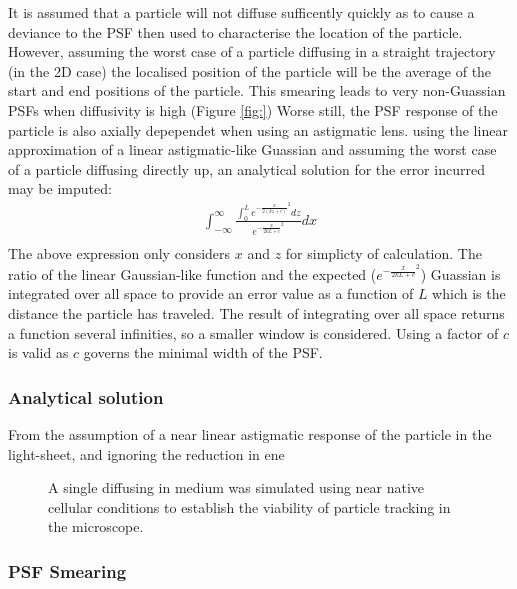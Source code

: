 It is assumed that a particle will not diffuse sufficently quickly as to cause a deviance to the PSF then used to characterise the location of the particle.
However, assuming the worst case of a particle diffusing in a straight trajectory (in the 2D case) the localised position of the particle will be the average of the start and end positions of the particle.
This smearing leads to very non-Guassian PSFs when diffusivity is high (Figure \ref{fig:})
Worse still, the PSF response of the particle is also axially depependet when using an astigmatic lens.
using the linear approximation of a linear astigmatic-like Guassian and assuming the worst case of a particle diffusing directly up, an analytical solution for the error incurred may be imputed:
\begin{align}
  {\int_{-\infty}^{\infty} \frac{\int_{0}^{L} e^{-\frac{x}{2(kz+c)}^2} dz}{e^{-\frac{x}{2kL+c}^2}} dx} \\
\end{align}
The above expression only considers $x$ and $z$ for simplicty of calculation.
The ratio of the linear Gaussian-like function and the expected ($e^{-\frac{x}{2kL+c}^2}$) Guassian is integrated over all space to provide an error value as a function of $L$ which is the distance the particle has traveled. %
The result of integrating over all space returns a function several infinities, so a smaller window is considered.
Using a factor of $c$ is valid as $c$ governs the minimal width of the PSF.


\subsubsection{Analytical solution}

From the assumption of a near linear astigmatic response of the particle in the light-sheet, and ignoring the reduction in ene

\begin{figure}
  \centering
  \caption{A single diffusing in medium was simulated using near native cellular conditions to establish the viability of particle tracking in the microscope.}
  \label{}
\end{figure}

\subsubsection{PSF Smearing}

